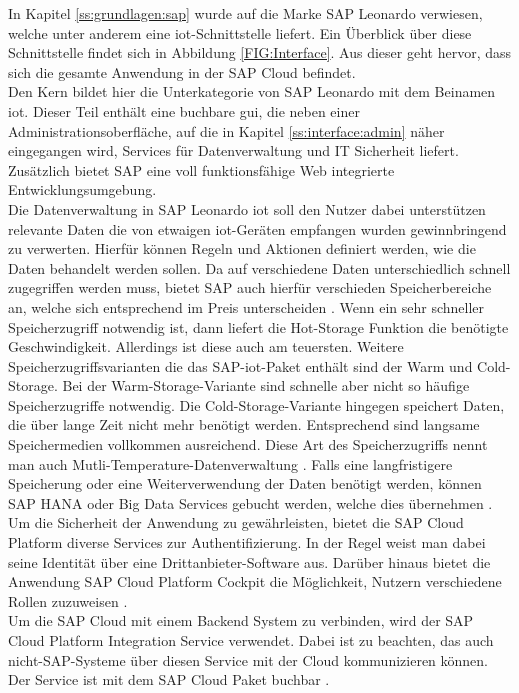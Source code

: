 In Kapitel \ref{ss:grundlagen:sap} wurde auf die Marke SAP Leonardo verwiesen, welche unter anderem eine \ac{iot}-Schnittstelle liefert. Ein Überblick über diese Schnittstelle findet sich in Abbildung \ref{FIG:Interface}. Aus dieser geht hervor, dass sich die gesamte Anwendung in der SAP Cloud befindet.\\
\noindent Den Kern bildet hier die Unterkategorie von SAP Leonardo mit dem Beinamen \ac{iot}. Dieser Teil enthält eine buchbare \ac{gui}, die neben einer Administrationsoberfläche, auf die in Kapitel \ref{ss:interface:admin} näher eingegangen wird, Services für Datenverwaltung und IT Sicherheit liefert. Zusätzlich bietet SAP eine voll funktionsfähige Web integrierte Entwicklungsumgebung.\\
\noindent Die Datenverwaltung in SAP Leonardo \ac{iot} soll den Nutzer dabei unterstützen relevante Daten die von etwaigen \ac{iot}-Geräten empfangen wurden gewinnbringend zu verwerten. Hierfür können Regeln und Aktionen definiert werden, wie die Daten behandelt werden sollen. Da auf verschiedene Daten unterschiedlich schnell zugegriffen werden muss, bietet SAP auch hierfür verschieden Speicherbereiche an, welche sich entsprechend im Preis unterscheiden \cite[Seite 173]{Holtschulte20:IOS}. Wenn ein sehr schneller Speicherzugriff notwendig ist, dann liefert die Hot-Storage Funktion die benötigte Geschwindigkeit. Allerdings ist diese auch am teuersten. Weitere Speicherzugriffsvarianten die das SAP-\ac{iot}-Paket enthält sind der Warm und Cold-Storage. Bei der Warm-Storage-Variante sind schnelle aber nicht so häufige Speicherzugriffe notwendig. Die Cold-Storage-Variante hingegen speichert Daten, die über lange Zeit nicht mehr benötigt werden. Entsprechend sind langsame Speichermedien vollkommen ausreichend. Diese Art des Speicherzugriffs nennt man auch Mutli-Temperature-Datenverwaltung \cite[Seite 118f]{Holtschulte20:IOS}. Falls eine langfristigere Speicherung oder eine Weiterverwendung der Daten benötigt werden, können SAP HANA oder Big Data Services gebucht werden, welche dies übernehmen \cite[Seite 173]{Holtschulte20:IOS}.\\    
\noindent Um die Sicherheit der Anwendung zu gewährleisten, bietet die SAP Cloud Platform diverse Services zur Authentifizierung. In der Regel weist man dabei seine Identität über eine Drittanbieter-Software aus. Darüber hinaus bietet die Anwendung SAP Cloud Platform Cockpit die Möglichkeit, Nutzern verschiedene Rollen zuzuweisen \cite[Seite 176ff]{Holtschulte20:IOS}.\\
\noindent Um die SAP Cloud mit einem Backend System zu verbinden, wird der SAP Cloud Platform Integration Service verwendet. Dabei ist zu beachten, das auch nicht-SAP-Systeme über diesen Service mit der Cloud kommunizieren können. Der Service ist mit dem SAP Cloud Paket buchbar \cite[Seite 146]{Holtschulte20:IOS}.\\
